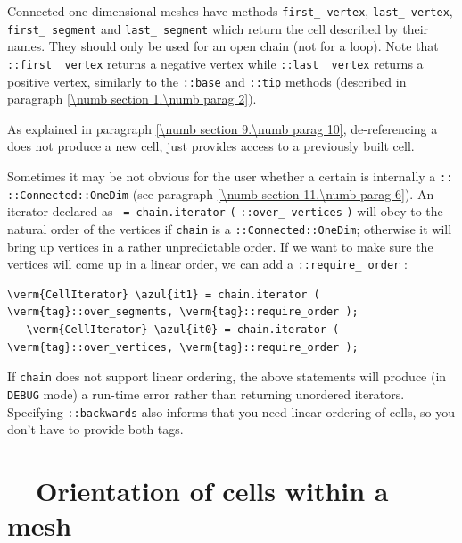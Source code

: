 Connected one-dimensional meshes have methods {\small\tt first\_\,vertex},
{\small\tt last\_\,vertex}, {\small\tt first\_\,segment} and {\small\tt last\_\,segment}
which return the cell described by their names.
They should only be used for an open chain (not for a loop).
Note that {\small\tt {}::first\_\,vertex} returns a negative vertex while
{\small\tt {}::last\_\,vertex} returns a positive vertex, similarly to the
{\small\tt {}::base} and {\small\tt {}::tip} methods (described in paragraph
\ref{\numb section 1.\numb parag 2}).

As explained in paragraph \ref{\numb section 9.\numb parag 10},
de-referencing a {\small\tt {}} does not produce a new cell,
just provides access to a previously built cell.

Sometimes it may be not obvious for the user whether a certain {\small\tt {}}
is internally a {\small\tt {}:: ::Connected::OneDim}
(see paragraph \ref{\numb section 11.\numb parag 6}).
An iterator declared as {\small\tt {} = chain.iterator}\break
{\small\tt(} {\small\tt{}::over\_\,vertices} {\small\tt)} will obey to
the natural order of the vertices if {\small\tt chain} is a\break
{\small\tt {}::Connected::OneDim}; otherwise it will bring up vertices
in a rather unpredictable order.
If we want to make sure the vertices will come up in a linear order, we can add a
{\small\tt {}::require\_\,order} :

\begin{Verbatim}[commandchars=\\\{\},formatcom=\small\tt,
   baselinestretch=0.94,framesep=2mm                      ]
   \verm{CellIterator} \azul{it1} = chain.iterator ( \verm{tag}::over_segments, \verm{tag}::require_order );
   \verm{CellIterator} \azul{it0} = chain.iterator ( \verm{tag}::over_vertices, \verm{tag}::require_order );
\end{Verbatim}

If {\small\tt chain} does not support linear ordering, the above statements will produce
(in {\small\tt DEBUG} mode) a run-time error rather than returning unordered iterators.
Specifying {\small\tt{}::backwards} also informs {\maniFEM} that you need
linear ordering of cells, so you don't have to provide both tags.

\section{~~Orientation of cells within a mesh}\label{\numb section 9.\numb parag 5}

